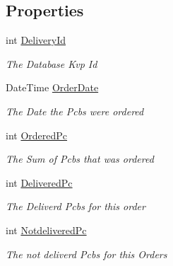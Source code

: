 \subsection*{Properties}
\begin{DoxyCompactItemize}
\item 
int \hyperlink{classkpi_mvc_api_1_1_data_transfer_objects_1_1_delivery_data_dto_acc50e99521ed39ca0520910392b81b6c}{Delivery\+Id}
\begin{DoxyCompactList}\small\item\em The Database Kvp Id \end{DoxyCompactList}\item 
Date\+Time \hyperlink{classkpi_mvc_api_1_1_data_transfer_objects_1_1_delivery_data_dto_a816b8aaa711de27d9bac314a69a8fefd}{Order\+Date}
\begin{DoxyCompactList}\small\item\em The Date the Pcbs were ordered \end{DoxyCompactList}\item 
int \hyperlink{classkpi_mvc_api_1_1_data_transfer_objects_1_1_delivery_data_dto_ac97bb2c2e73257f8dfb0d20cb1747c3f}{Ordered\+Pc}
\begin{DoxyCompactList}\small\item\em The Sum of Pcbs that was ordered \end{DoxyCompactList}\item 
int \hyperlink{classkpi_mvc_api_1_1_data_transfer_objects_1_1_delivery_data_dto_a84c60974ddfb9c71ea8ee61397cb7355}{Delivered\+Pc}
\begin{DoxyCompactList}\small\item\em The Deliverd Pcbs for this order \end{DoxyCompactList}\item 
int \hyperlink{classkpi_mvc_api_1_1_data_transfer_objects_1_1_delivery_data_dto_a24a69e8e85b7e40599b96ac98ca38601}{Notdelivered\+Pc}
\begin{DoxyCompactList}\small\item\em The not deliverd Pcb\textquotesingle{}s for this Orders \end{DoxyCompactList}\item 

\end{DoxyCompactItemize}
